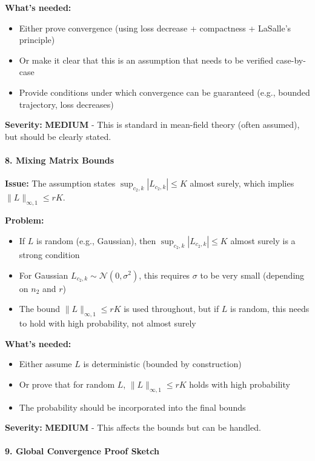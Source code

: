 \textbf{What's needed:}
\begin{itemize}
\item Either prove convergence (using loss decrease + compactness + LaSalle's principle)
\item Or make it clear that this is an assumption that needs to be verified case-by-case
\item Provide conditions under which convergence can be guaranteed (e.g., bounded trajectory, loss decreases)
\end{itemize}

\textbf{Severity:} \textbf{MEDIUM} - This is standard in mean-field theory (often assumed), but should be clearly stated.

\paragraph*{8. Mixing Matrix Bounds}

\textbf{Issue:} The assumption states $\sup_{c_2,k}|L_{c_2,k}| \le K$ almost surely, which implies $\|L\|_{\infty,1} \le rK$.

\textbf{Problem:}
\begin{itemize}
\item If $L$ is random (e.g., Gaussian), then $\sup_{c_2,k}|L_{c_2,k}| \le K$ almost surely is a strong condition
\item For Gaussian $L_{c_2,k} \sim \mathcal{N}(0, \sigma^2)$, this requires $\sigma$ to be very small (depending on $n_2$ and $r$)
\item The bound $\|L\|_{\infty,1} \le rK$ is used throughout, but if $L$ is random, this needs to hold with high probability, not almost surely
\end{itemize}

\textbf{What's needed:}
\begin{itemize}
\item Either assume $L$ is deterministic (bounded by construction)
\item Or prove that for random $L$, $\|L\|_{\infty,1} \le rK$ holds with high probability
\item The probability should be incorporated into the final bounds
\end{itemize}

\textbf{Severity:} \textbf{MEDIUM} - This affects the bounds but can be handled.

\paragraph*{9. Global Convergence Proof Sketch}

